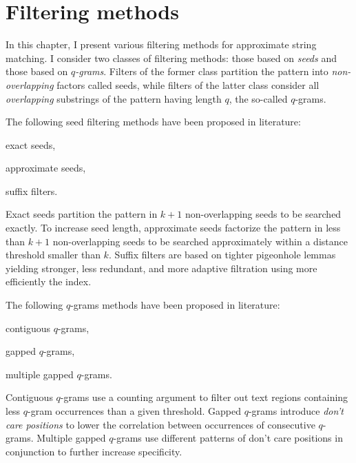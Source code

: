\chapter{Filtering methods}

In this chapter, I present various filtering methods for approximate string matching.
I consider two classes of filtering methods: those based on \emph{seeds} and those based on \emph{$q$-grams}.
Filters of the former class partition the pattern into \emph{non-overlapping} factors called seeds, while filters of the latter class consider all \emph{overlapping} substrings of the pattern having length $q$, the so-called $q$-grams.


The following seed filtering methods have been proposed in literature:
\begin{inparaenum}[(i)]
\item exact seeds,
\item approximate seeds,
\item suffix filters.
\end{inparaenum}
Exact seeds partition the pattern in $k+1$ non-overlapping seeds to be searched exactly.
To increase seed length, approximate seeds factorize the pattern in less than $k+1$ non-overlapping seeds to be searched approximately within a distance threshold smaller than $k$.
Suffix filters are based on tighter pigeonhole lemmas yielding stronger, less redundant, and more adaptive filtration using more efficiently the index.

The following $q$-grams methods have been proposed in literature:
\begin{inparaenum}[(i)]
\item contiguous $q$-grams,
\item gapped $q$-grams,
\item multiple gapped $q$-grams.
\end{inparaenum}
Contiguous $q$-grams use a counting argument to filter out text regions containing less $q$-gram occurrences than a given threshold.
Gapped $q$-grams introduce \emph{don't care positions} to lower the correlation between occurrences of consecutive $q$-grams.
Multiple gapped $q$-grams use different patterns of don't care positions in conjunction to further increase specificity.


